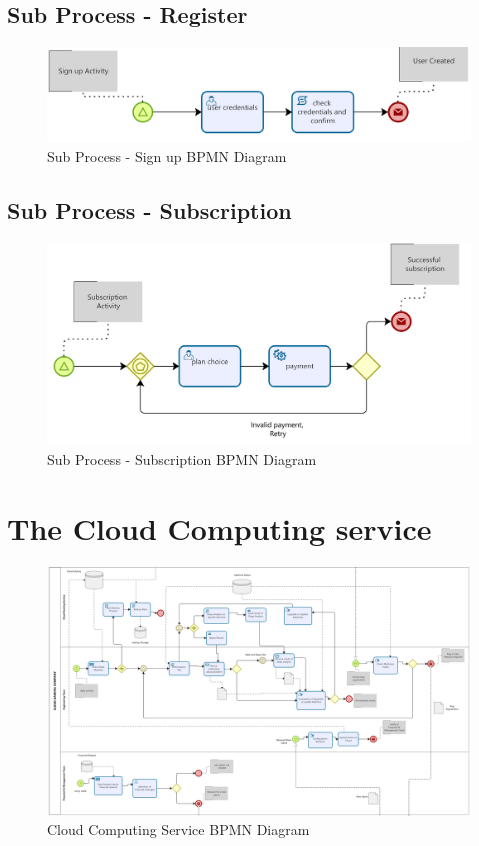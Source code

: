 \documentclass[a4paper,12pt]{report}
\begin{document}
\subsection{Sub Process - Register }
\begin{figure}[H]
 \centering
\includegraphics[scale=0.35]{signup_BPMN}
\caption{Sub Process - Sign up BPMN Diagram}
\label{Signup BPMN}
\end{figure} 

\subsection{Sub Process - Subscription }
\begin{figure}[H]
 \centering
\includegraphics[scale=0.35]{subscription_BPMN}
\caption{Sub Process - Subscription BPMN Diagram}
\label{Subscription BPMN}
\end{figure} 

\section{The Cloud Computing service }
\begin{figure}[H]
 \centering
\includegraphics[scale=0.15]{cloud_BPMN}
\caption{Cloud Computing Service BPMN Diagram}
\label{Cloud BPMN}

\end{figure}
\end{document}
